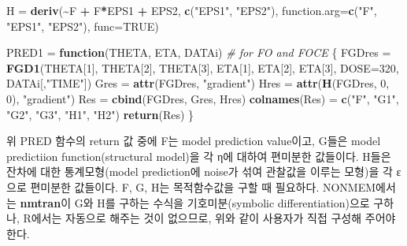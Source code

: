 \documentclass[
  11pt,
  krantz2,
  a4paper]{krantz}
\newenvironment{Shaded}{\begin{snugshade}}{\end{snugshade}}
\newcommand{\CommentTok}[1]{\textcolor[rgb]{0.56,0.35,0.01}{\textit{#1}}}
\newcommand{\ControlFlowTok}[1]{\textcolor[rgb]{0.13,0.29,0.53}{\textbf{#1}}}
\newcommand{\DataTypeTok}[1]{\textcolor[rgb]{0.13,0.29,0.53}{#1}}
\newcommand{\DecValTok}[1]{\textcolor[rgb]{0.00,0.00,0.81}{#1}}
\newcommand{\KeywordTok}[1]{\textcolor[rgb]{0.13,0.29,0.53}{\textbf{#1}}}
\newcommand{\NormalTok}[1]{#1}
\newcommand{\OperatorTok}[1]{\textcolor[rgb]{0.81,0.36,0.00}{\textbf{#1}}}
\newcommand{\OtherTok}[1]{\textcolor[rgb]{0.56,0.35,0.01}{#1}}
\newcommand{\StringTok}[1]{\textcolor[rgb]{0.31,0.60,0.02}{#1}}
\theoremstyle{definition}
\theoremstyle{definition}
\theoremstyle{definition}
\theoremstyle{remark}
\begin{document}
\begin{Shaded}
\begin{Highlighting}[]
\NormalTok{H =}\StringTok{ }\KeywordTok{deriv}\NormalTok{(}\OperatorTok{\textasciitilde{}}\NormalTok{F }\OperatorTok{+}\StringTok{ }\NormalTok{F}\OperatorTok{*}\NormalTok{EPS1 }\OperatorTok{+}\StringTok{ }\NormalTok{EPS2, }\KeywordTok{c}\NormalTok{(}\StringTok{"EPS1"}\NormalTok{, }\StringTok{"EPS2"}\NormalTok{), }
          \DataTypeTok{function.arg=}\KeywordTok{c}\NormalTok{(}\StringTok{"F"}\NormalTok{, }\StringTok{"EPS1"}\NormalTok{, }\StringTok{"EPS2"}\NormalTok{), }
          \DataTypeTok{func=}\OtherTok{TRUE}\NormalTok{)}

\NormalTok{PRED1 =}\StringTok{ }\ControlFlowTok{function}\NormalTok{(THETA, ETA, DATAi)  }\CommentTok{\# for FO and FOCE}
\NormalTok{\{}
\NormalTok{  FGDres =}\StringTok{ }\KeywordTok{FGD1}\NormalTok{(THETA[}\DecValTok{1}\NormalTok{], THETA[}\DecValTok{2}\NormalTok{], THETA[}\DecValTok{3}\NormalTok{], ETA[}\DecValTok{1}\NormalTok{], ETA[}\DecValTok{2}\NormalTok{], ETA[}\DecValTok{3}\NormalTok{], }
                \DataTypeTok{DOSE=}\DecValTok{320}\NormalTok{, DATAi[,}\StringTok{"TIME"}\NormalTok{])}
\NormalTok{  Gres =}\StringTok{ }\KeywordTok{attr}\NormalTok{(FGDres, }\StringTok{"gradient"}\NormalTok{)}
\NormalTok{  Hres =}\StringTok{ }\KeywordTok{attr}\NormalTok{(}\KeywordTok{H}\NormalTok{(FGDres, }\DecValTok{0}\NormalTok{, }\DecValTok{0}\NormalTok{), }\StringTok{"gradient"}\NormalTok{)}
\NormalTok{  Res =}\StringTok{ }\KeywordTok{cbind}\NormalTok{(FGDres, Gres, Hres)}
  \KeywordTok{colnames}\NormalTok{(Res) =}\StringTok{ }\KeywordTok{c}\NormalTok{(}\StringTok{"F"}\NormalTok{, }\StringTok{"G1"}\NormalTok{, }\StringTok{"G2"}\NormalTok{, }\StringTok{"G3"}\NormalTok{, }\StringTok{"H1"}\NormalTok{, }\StringTok{"H2"}\NormalTok{)}
  \KeywordTok{return}\NormalTok{(Res)}
\NormalTok{\}}
\end{Highlighting}
\end{Shaded}

\normalsize


위 PRED 함수의 return 값 중에 F는 model prediction value이고, G들은 model predictiion function(structural model)을 각 η에 대하여 편미분한 값들이다. H들은 잔차에 대한 통계모형(model prediction에 noise가 섞여 관찰값을 이루는 모형)을 각 ε으로 편미분한 값들이다. F, G, H는 목적함수값을 구할 때 필요하다. NONMEM에서는 \textbf{nmtran}이 G와 H를 구하는 수식을 기호미분(symbolic differentiation)으로 구하나, R에서는 자동으로 해주는 것이 없으므로, 위와 같이 사용자가 직접 구성해 주어야 한다.
\end{document}
